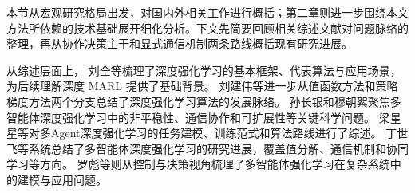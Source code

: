 本节从宏观研究格局出发，对国内外相关工作进行概括；第二章则进一步围绕本文方法所依赖的技术基础展开细化分析。下文先简要回顾相关综述文献对问题脉络的整理，再从协作决策主干和显式通信机制两条路线概括现有研究进展。

从综述层面上，
刘全等梳理了深度强化学习的基本框架、代表算法与应用场景，
为后续理解深度 MARL 提供了基础背景\cite{liu2018drlsurvey_cn}。
刘建伟等进一步从值函数方法和策略梯度方法两个分支总结了深度强化学习算法的发展脉络\cite{liu2019valuepolicydrl_cn}。
孙长银和穆朝絮聚焦多智能体深度强化学习中的非平稳性、通信协作和可扩展性等关键科学问题\cite{sun2020madrkey_cn}。
梁星星等对多Agent深度强化学习的任务建模、训练范式和算法路线进行了综述\cite{liang2020multiagentdrlsurvey_cn}。
丁世飞等系统总结了多智能体深度强化学习的研究进展，覆盖值分解、通信机制和协同学习等方向\cite{ding2024madrlprogress_cn}。
罗彪等则从控制与决策视角梳理了多智能体强化学习在复杂系统中的建模与应用问题\cite{luo2025marlcontrol_cn}。

